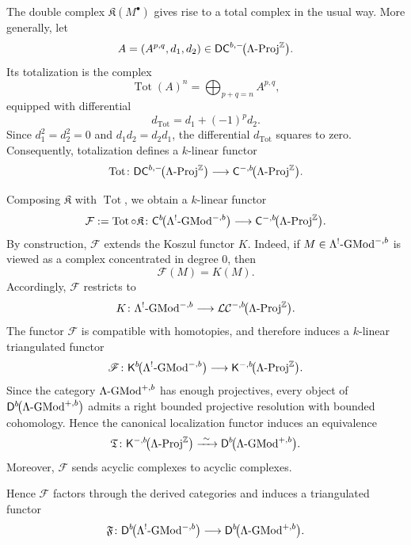 \documentclass[11pt]{article}
\theoremstyle{definition}
\theoremstyle{remark}
\begin{document}
The double complex \(\mathfrak{K}(M^\bullet)\) gives rise to a total complex in
the usual way. More generally, let
\[
A=(A^{p,q},d_1,d_2)
\in
\mathsf{DC}^{b,-}\!\bigl(\Lambda\textup{-}\mathrm{Proj}^{\mathbb{Z}}\bigr).
\]
Its totalization is the complex
\[
\operatorname{Tot}(A)^n
=
\bigoplus_{p+q=n}A^{p,q},
\]
equipped with differential
\[
d_{\operatorname{Tot}}
=
d_1+(-1)^p d_2.
\]
Since \(d_1^2=d_2^2=0\) and \(d_1d_2=d_2d_1\), the differential
\(d_{\operatorname{Tot}}\) squares to zero. Consequently, totalization defines
a \(k\)-linear functor
\[
\operatorname{Tot}\colon
\mathsf{DC}^{b,-}\!\bigl(\Lambda\textup{-}\mathrm{Proj}^{\mathbb{Z}}\bigr)
\longrightarrow
\mathsf{C}^{-,b}\!\bigl(\Lambda\textup{-}\mathrm{Proj}^{\mathbb{Z}}\bigr).
\]

Composing \(\mathfrak{K}\) with \(\operatorname{Tot}\), we obtain a
\(k\)-linear functor
\[
\mathcal{F}
:=
\operatorname{Tot}\circ\mathfrak{K}
\colon
\mathsf{C}^{b}\!\bigl(\Lambda^{!}\textup{-}\mathrm{GMod}^{-,b}\bigr)
\longrightarrow
\mathsf{C}^{-,b}\!\bigl(\Lambda\textup{-}\mathrm{Proj}^{\mathbb{Z}}\bigr).
\]
 By construction,
\(\mathcal{F}\) extends the Koszul functor \(K\). Indeed, if
\(M\in\Lambda^{!}\textup{-}\mathrm{GMod}^{-,b}\) is viewed as a complex
concentrated in degree \(0\), then
\[
\mathcal{F}(M)=K(M).
\]
Accordingly, \(\mathcal{F}\) restricts to
\[
K\colon
\Lambda^{!}\textup{-}\mathrm{GMod}^{-,b}
\longrightarrow
\mathcal{LC}^{-,b}\!\bigl(\Lambda\textup{-}\mathrm{Proj}^{\mathbb{Z}}\bigr).
\]
The functor \(\mathcal{F}\) is compatible with homotopies, and therefore induces a \(k\)-linear triangulated functor
\[
\mathscr{F}\colon
\mathsf{K}^{b}\!\bigl(\Lambda^{!}\textup{-}\mathrm{GMod}^{-,b}\bigr)
\longrightarrow
\mathsf{K}^{-,b}\!\bigl(\Lambda\textup{-}\mathrm{Proj}^{\mathbb{Z}}\bigr).
\]
Since the category \(\Lambda\textup{-}\mathrm{GMod}^{+,b}\) has enough
projectives, every object of
\(\mathsf{D}^{b}\!\bigl(\Lambda\textup{-}\mathrm{GMod}^{+,b}\bigr)\)
admits a right bounded projective resolution with bounded cohomology. Hence
the canonical localization functor induces an equivalence
\[
\mathfrak{T}\colon
\mathsf{K}^{-,b}\!\bigl(\Lambda\textup{-}\mathrm{Proj}^{\mathbb{Z}}\bigr)
\xrightarrow{\ \sim\ }
\mathsf{D}^{b}\!\bigl(\Lambda\textup{-}\mathrm{GMod}^{+,b}\bigr).
\]
Moreover, \(\mathscr{F}\) sends acyclic complexes to acyclic complexes.

\medskip 

Hence
\(\mathscr{F}\) factors through the derived categories and induces a triangulated functor
\[
\mathfrak{F}\colon
\mathsf{D}^{b}\!\bigl(\Lambda^{!}\textup{-}\mathrm{GMod}^{-,b}\bigr)
\longrightarrow
\mathsf{D}^{b}\!\bigl(\Lambda\textup{-}\mathrm{GMod}^{+,b}\bigr).
\]
\end{document}
